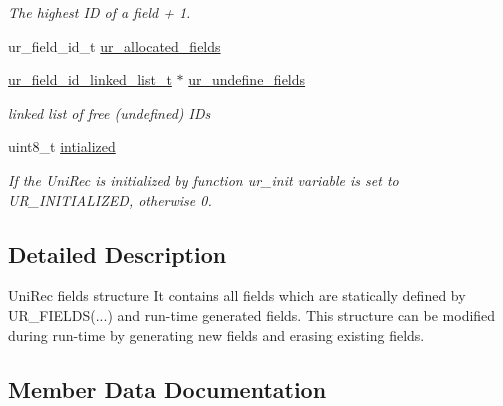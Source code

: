 \begin{DoxyCompactItemize}
\begin{DoxyCompactList}\small\item\em The highest ID of a field + 1. \end{DoxyCompactList}\item 
ur\+\_\+field\+\_\+id\+\_\+t \hyperlink{structur__field__specs__t_abe745769ca4dd67bf653de0687033da9}{ur\+\_\+allocated\+\_\+fields}
\item 
\hyperlink{structur__field__id__linked__list__s}{ur\+\_\+field\+\_\+id\+\_\+linked\+\_\+list\+\_\+t} $\ast$ \hyperlink{structur__field__specs__t_a217c15792290530a3e08fa5973c8ca5a}{ur\+\_\+undefine\+\_\+fields}\hypertarget{structur__field__specs__t_a217c15792290530a3e08fa5973c8ca5a}{}\label{structur__field__specs__t_a217c15792290530a3e08fa5973c8ca5a}

\begin{DoxyCompactList}\small\item\em linked list of free (undefined) I\+Ds \end{DoxyCompactList}\item 
uint8\+\_\+t \hyperlink{structur__field__specs__t_a2049527f65320075c1e5e3bb9c9aff15}{intialized}\hypertarget{structur__field__specs__t_a2049527f65320075c1e5e3bb9c9aff15}{}\label{structur__field__specs__t_a2049527f65320075c1e5e3bb9c9aff15}

\begin{DoxyCompactList}\small\item\em If the Uni\+Rec is initialized by function ur\+\_\+init variable is set to U\+R\+\_\+\+I\+N\+I\+T\+I\+A\+L\+I\+Z\+ED, otherwise 0. \end{DoxyCompactList}\end{DoxyCompactItemize}


\subsection{Detailed Description}
Uni\+Rec fields structure It contains all fields which are statically defined by U\+R\+\_\+\+F\+I\+E\+L\+DS(...) and run-\/time generated fields. This structure can be modified during run-\/time by generating new fields and erasing existing fields. 

\subsection{Member Data Documentation}

